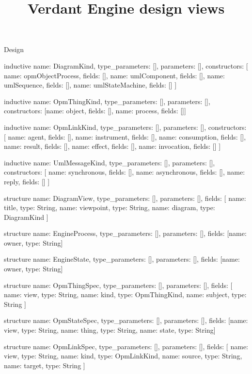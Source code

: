 \begin{lexlean}{Design}
\title{Verdant Engine design views}
\begin{semanticmodule}
inductive{
  name: DiagramKind,
  type_parameters: [],
  parameters: [],
  constructors: [
    {name: opmObjectProcess, fields: []},
    {name: umlComponent, fields: []},
    {name: umlSequence, fields: []},
    {name: umlStateMachine, fields: []}
  ]
}

inductive{
  name: OpmThingKind,
  type_parameters: [],
  parameters: [],
  constructors: [{name: object, fields: []}, {name: process, fields: []}]
}

inductive{
  name: OpmLinkKind,
  type_parameters: [],
  parameters: [],
  constructors: [
    {name: agent, fields: []},
    {name: instrument, fields: []},
    {name: consumption, fields: []},
    {name: result, fields: []},
    {name: effect, fields: []},
    {name: invocation, fields: []}
  ]
}

inductive{
  name: UmlMessageKind,
  type_parameters: [],
  parameters: [],
  constructors: [
    {name: synchronous, fields: []},
    {name: asynchronous, fields: []},
    {name: reply, fields: []}
  ]
}

structure{
  name: DiagramView,
  type_parameters: [],
  parameters: [],
  fields: [
    {name: title, type: String},
    {name: viewpoint, type: String},
    {name: diagram, type: DiagramKind}
  ]
}

structure{
  name: EngineProcess,
  type_parameters: [],
  parameters: [],
  fields: [{name: owner, type: String}]
}

structure{
  name: EngineState,
  type_parameters: [],
  parameters: [],
  fields: [{name: owner, type: String}]
}

structure{
  name: OpmThingSpec,
  type_parameters: [],
  parameters: [],
  fields: [
    {name: view, type: String},
    {name: kind, type: OpmThingKind},
    {name: subject, type: String}
  ]
}

structure{
  name: OpmStateSpec,
  type_parameters: [],
  parameters: [],
  fields: [{name: view, type: String}, {name: thing, type: String}, {name: state, type: String}]
}

structure{
  name: OpmLinkSpec,
  type_parameters: [],
  parameters: [],
  fields: [
    {name: view, type: String},
    {name: kind, type: OpmLinkKind},
    {name: source, type: String},
    {name: target, type: String}
  ]
}


\end{semanticmodule}
\end{lexlean}
